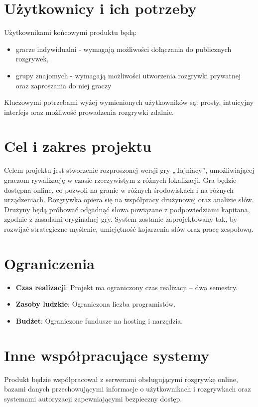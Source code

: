 \documentclass[12pt,a4paper]{book}
\begin{document}
\section{Użytkownicy i ich potrzeby}
Użytkownikami końcowymi produktu będą:
\begin{itemize}
    \item gracze indywidualni - wymagają możliwości dołączania do publicznych rozgrywek, 
    \item grupy znajomych - wymagają możliwości utworzenia rozgrywki prywatnej oraz zaproszania do niej graczy
\end{itemize}
Kluczowymi potrzebami wyżej wymienionych użytkowników są: prosty, intuicyjny interfejs oraz możliwość prowadzenia rozgrywki zdalnie.

\section{Cel i zakres projektu}
Celem projektu jest stworzenie rozproszonej wersji gry „Tajniacy”, umożliwiającej graczom rywalizację w czasie rzeczywistym z różnych lokalizacji. Gra będzie dostępna online, co pozwoli na granie w różnych środowiskach i na różnych urządzeniach. Rozgrywka opiera się na współpracy drużynowej oraz analizie słów. Drużyny będą próbować odgadnąć słowa powiązane z podpowiedziami kapitana, zgodnie z zasadami oryginalnej gry. System zostanie zaprojektowany tak, by rozwijać strategiczne myślenie, umiejętność kojarzenia słów oraz pracę zespołową. 

\section{Ograniczenia}
\begin{itemize}
    \item \textbf{Czas realizacji}: Projekt ma ograniczony czas realizacji – dwa semestry. 
    \item \textbf{Zasoby ludzkie}: Ograniczona liczba programistów.
    \item \textbf{Budżet}: Ograniczone fundusze na hosting i narzędzia. 
\end{itemize}

\section{Inne współpracujące systemy}
Produkt będzie współpracował z serwerami obsługującymi rozgrywkę online, bazami danych przechowującymi informacje o użytkownikach i rozgrywkach oraz systemami autoryzacji zapewniającymi bezpieczny dostęp.
\end{document}
